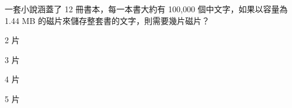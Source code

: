 \ifx\ntpcNinetyTwo\undefined[92學年基北區] \fi
一套小說涵蓋了 12 冊書本，每一本書大約有 100,000 個中文字，如果以容量為 1.44 MB 的磁片來儲存整套書的文字，則需要幾片磁片？
  \begin{optionlist}
  \item 2 片	\label{ntpc-92-a10}
  \item 3 片
  \item 4 片	
  \item 5 片
  \end{optionlist}